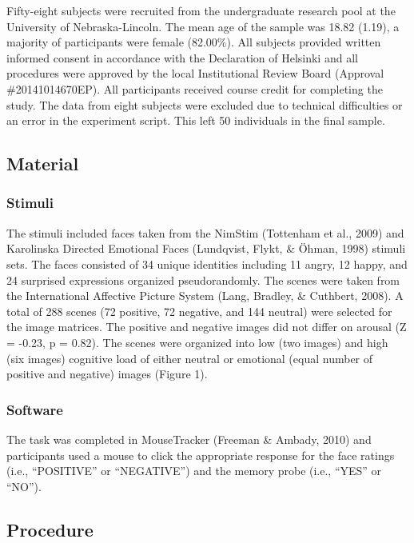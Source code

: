 \documentclass[man]{apa6}
\begin{document}
Fifty-eight subjects were recruited from the undergraduate research pool at the University of Nebraska-Lincoln. The mean age of the sample was 18.82 (1.19), a majority of participants were female (82.00\%). All subjects provided written informed consent in accordance with the Declaration of Helsinki and all procedures were approved by the local Institutional Review Board (Approval \#20141014670EP). All participants received course credit for completing the study. The data from eight subjects were excluded due to technical difficulties or an error in the experiment script. This left 50 individuals in the final sample.

\hypertarget{material}{%
\subsection{Material}\label{material}}

\hypertarget{stimuli}{%
\subsubsection{Stimuli}\label{stimuli}}

The stimuli included faces taken from the NimStim (Tottenham et al., 2009) and Karolinska Directed Emotional Faces (Lundqvist, Flykt, \& Öhman, 1998) stimuli sets. The faces consisted of 34 unique identities including 11 angry, 12 happy, and 24 surprised expressions organized pseudorandomly. The scenes were taken from the International Affective Picture System (Lang, Bradley, \& Cuthbert, 2008). A total of 288 scenes (72 positive, 72 negative, and 144 neutral) were selected for the image matrices. The positive and negative images did not differ on arousal (Z = -0.23, p = 0.82). The scenes were organized into low (two images) and high (six images) cognitive load of either neutral or emotional (equal number of positive and negative) images (Figure 1).

\hypertarget{software}{%
\subsubsection{Software}\label{software}}

The task was completed in MouseTracker (Freeman \& Ambady, 2010) and participants used a mouse to click the appropriate response for the face ratings (i.e., \enquote{POSITIVE} or \enquote{NEGATIVE}) and the memory probe (i.e., \enquote{YES} or \enquote{NO}).

\hypertarget{procedure}{%
\subsection{Procedure}\label{procedure}}
\end{document}
